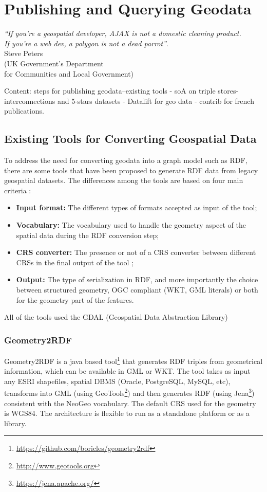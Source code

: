 
\chapter{Publishing and Querying Geodata}
\label{ch:ch2}

\begin{flushright}
\textit{``If you're a geospatial developer, AJAX is not a domestic cleaning product. \\
If you're a web dev, a polygon is not a dead parrot''}.\\
Steve Peters \\
(UK Government's Department \\for Communities and Local Government) 

\end{flushright}
Content: 
 steps for publishing geodata--existing tools -
 soA on triple stores- 
 interconnections and 5-stars datasets -
 Datalift for geo data -
 contrib for french publications.


\section{Existing Tools for Converting Geospatial Data}
\label{sec:toolgeo}
To address the need for converting geodata into a graph model such as RDF, there are some tools that have been proposed to generate RDF data from legacy geospatial datasets. The differences among the tools are based on four main criteria :
\begin{itemize}
\item \textbf{Input format:} The different types of formats accepted as input of the tool;
\item \textbf{Vocabulary:} The vocabulary used to handle the geometry aspect of the spatial data during the RDF conversion step;
\item \textbf{CRS converter:} The presence or not of a CRS converter between different CRSs in the final output of the tool ;
\item \textbf{Output:} The type of serialization in RDF, and more importantly the choice between structured geometry, OGC compliant (WKT, GML literals) or both for the geometry part of the features.
\end{itemize}

All of the tools used the GDAL (Geospatial Data Abstraction Library)

\subsection{Geometry2RDF} \label{sec:geo2rdf}
Geometry2RDF \cite{deLeon2010} is a java based tool\footnote{\url{https://github.com/boricles/geometry2rdf}} that generates RDF triples from geometrical information, which can be available in GML or WKT. The tool takes as input any ESRI shapefiles, spatial DBMS (Oracle,  PostgreSQL, MySQL, etc), transforms into GML (using GeoTools\footnote{\url{http://www.geotools.org}}) and then generates RDF (using Jena\footnote{\url{https://jena.apache.org/}}) consistent with the NeoGeo vocabulary. The default CRS used for the geometry is WGS84. The architecture is flexible to run as a standalone platform or as a library. 


